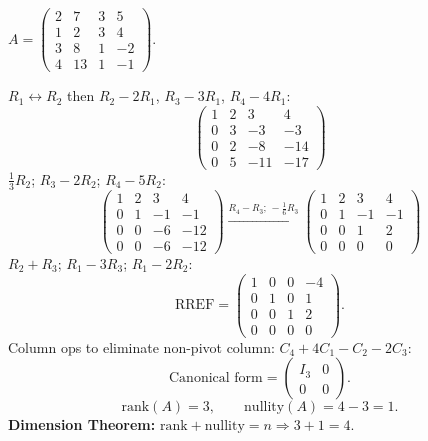 \documentclass[12pt,a3paper]{article}
\begin{document}
\begin{tcolorbox}[enhanced,breakable,
  colback=cB!4,colframe=cB,boxrule=0.8pt,arc=5pt,
  title={\textbf{Answer --- Canonical Form; Rank, Nullity; Dimension Theorem}},
  fonttitle=\bfseries\color{white},colbacktitle=cB]

$A=\begin{pmatrix}2&7&3&5\\1&2&3&4\\3&8&1&-2\\4&13&1&-1\end{pmatrix}$.

$R_1\leftrightarrow R_2$ then $R_2-2R_1$, $R_3-3R_1$, $R_4-4R_1$:
\[
\begin{pmatrix}1&2&3&4\\0&3&-3&-3\\0&2&-8&-14\\0&5&-11&-17\end{pmatrix}
\]
$\frac{1}{3}R_2$; $R_3-2R_2$; $R_4-5R_2$:
\[
\begin{pmatrix}1&2&3&4\\0&1&-1&-1\\0&0&-6&-12\\0&0&-6&-12\end{pmatrix}
\xrightarrow{R_4-R_3;\,-\frac{1}{6}R_3}
\begin{pmatrix}1&2&3&4\\0&1&-1&-1\\0&0&1&2\\0&0&0&0\end{pmatrix}
\]
$R_2+R_3$; $R_1-3R_3$; $R_1-2R_2$:
\[
\text{RREF}=\begin{pmatrix}1&0&0&-4\\0&1&0&1\\0&0&1&2\\0&0&0&0\end{pmatrix}.
\]
Column ops to eliminate non-pivot column: $C_4+4C_1-C_2-2C_3$:
\[
\text{Canonical form}=\begin{pmatrix}I_3&0\\0&0\end{pmatrix}.
\]
\[
\mathrm{rank}(A)=3,\qquad\mathrm{nullity}(A)=4-3=1.
\]
\textbf{Dimension Theorem:} $\mathrm{rank}+\mathrm{nullity}=n \Rightarrow 3+1=4$. \checkmark

\end{tcolorbox}
\end{document}
